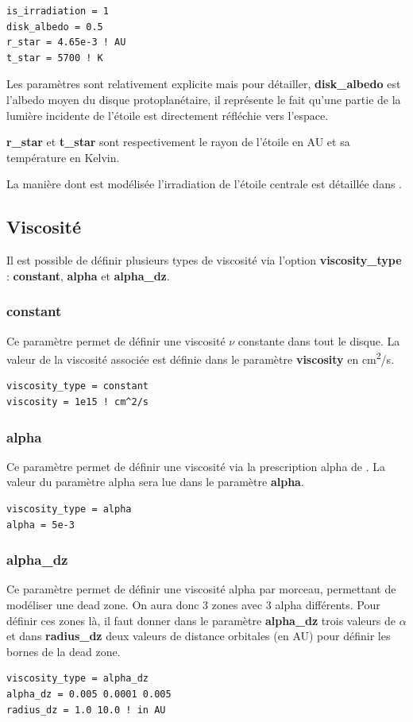 \begin{verbatim}
is_irradiation = 1
disk_albedo = 0.5
r_star = 4.65e-3 ! AU
t_star = 5700 ! K
\end{verbatim}

Les paramètres sont relativement explicite mais pour détailler, \textbf{disk\_albedo} est l'albedo moyen du disque protoplanétaire, il représente le fait qu'une partie de la lumière incidente de l'étoile est directement réfléchie vers l'espace.

\textbf{r\_star} et \textbf{t\_star} sont respectivement le rayon de l'étoile en AU et sa température en Kelvin.

La manière dont est modélisée l'irradiation de l'étoile centrale est détaillée dans .

\subsection{Viscosité}
Il est possible de définir plusieurs types de viscosité via l'option \textbf{viscosity\_type} : \textbf{constant}, \textbf{alpha} et \textbf{alpha\_dz}.

\subsubsection{constant}
Ce paramètre permet de définir une viscosité $\nu$ constante dans tout le disque. La valeur de la viscosité associée est définie dans le paramètre \textbf{viscosity} en \unit{cm^2/s}.

\begin{verbatim}
viscosity_type = constant
viscosity = 1e15 ! cm^2/s
\end{verbatim}

\subsubsection{alpha}
Ce paramètre permet de définir une viscosité via la prescription alpha de \cite{shakura1973black}. La valeur du paramètre alpha sera lue dans le paramètre \textbf{alpha}. 

\begin{verbatim}
viscosity_type = alpha
alpha = 5e-3
\end{verbatim}

\subsubsection{alpha\_dz}\label{sec:dead_zone}
Ce paramètre permet de définir une viscosité alpha par morceau, permettant de modéliser une dead zone. On aura donc 3 zones avec 3 alpha différents. Pour définir ces zones là, il faut donner dans le paramètre \textbf{alpha\_dz} trois valeurs de $\alpha$ et dans \textbf{radius\_dz} deux valeurs de distance orbitales (en AU) pour définir les bornes de la dead zone.
\begin{verbatim}
viscosity_type = alpha_dz
alpha_dz = 0.005 0.0001 0.005
radius_dz = 1.0 10.0 ! in AU
\end{verbatim}

